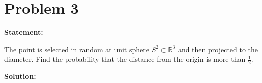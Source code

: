 \section*{Problem 3}

\textbf{Statement:}

The point is selected in random at unit sphere $S^2 \subset \mathbb{R}^3$ and
then projected to the diameter. Find the probability that the distance from
the origin is more than $\frac{1}{2}$.

\noindent\textbf{Solution:}